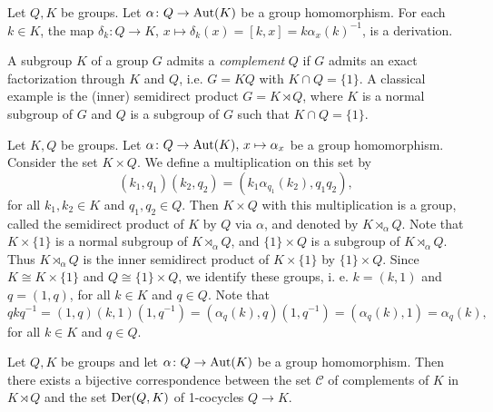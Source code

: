 \begin{example}
	Let $Q,K$ be groups. Let $\alpha\colon Q\rightarrow \operatorname{Aut}(K)$ be a group homomorphism.  For each $k\in K$, the map 
	$\delta_k\colon Q\to K$, $x\mapsto \delta_k(x)=[k,x]=k\alpha_x(k)^{-1}$, is a derivation. 
\end{example}



A subgroup $K$ of a group $G$ admits a {\em complement} $Q$ if $G$ admits an exact factorization 
through $K$ and $Q$, i.e. $G=KQ$ with $K\cap Q=\{1\}$. 
A classical example is the (inner) semidirect product $G=K\rtimes Q$, where $K$ is a normal subgroup of $G$ 
and $Q$ is a subgroup of $G$ such that $K\cap Q=\{1\}$. 

Let $K,Q$ be groups. Let $\alpha\colon Q\rightarrow \operatorname{Aut}(K),\,x\mapsto \alpha_x$ be a group homomorphism. Consider the set $K\times Q$. We define a multiplication on this set by
\[(k_1,q_1)(k_2,q_2)=(k_1\alpha_{q_1}(k_2),q_1q_2),\]
for all $k_1,k_2\in K$ and $q_1,q_2\in Q$. Then $K\times Q$ with this multiplication is a group, called the semidirect product of $K$ by $Q$ via $\alpha$, and denoted by $K\rtimes_{\alpha}Q$. Note that $K\times\{ 1\}$ is a normal subgroup of $K\rtimes_{\alpha}Q$, and $\{1\}\times Q$ is a subgroup of $K\rtimes_{\alpha}Q$. Thus $K\rtimes_{\alpha}Q$ is the inner semidirect product of $K\times\{ 1\}$ by $\{1\}\times Q$. Since $K\cong K\times\{ 1\}$ and $Q\cong \{1\}\times Q$, we identify these groups, i. e. $k=(k,1)$ and $q=(1,q)$, for all $k\in K$ and $q\in Q$. Note that
\[ qkq^{-1}=(1,q)(k,1)(1,q^{-1})=(\alpha_q(k),q)(1,q^{-1})=(\alpha_q(k),1)=\alpha_q(k),\]
for all $k\in K$ and $q\in Q$.

\begin{theorem}
	\label{thm:complements}
	Let $Q,K$ be groups and let $\alpha\colon Q\rightarrow \operatorname{Aut} (K)$ be a group homomorphism. Then there exists a bijective correspondence between
	the set $\mathcal{C}$ of complements of $K$ in $K\rtimes Q$ and the set 
    $\operatorname{Der}(Q,K)$ of 1-cocycles $Q\to K$.
\end{theorem}

